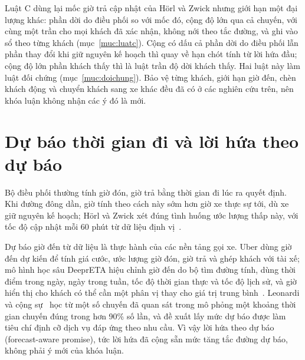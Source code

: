 Luật C dùng lại mốc giờ trả cập nhật của Hörl và Zwick nhưng giới hạn một đại lượng khác: phần dời do điều phối so với
mốc đó, cộng độ lớn qua cả chuyến, với cùng một trần cho mọi khách đã xác nhận, không nới theo tắc đường, và ghi vào sổ
theo từng khách (mục~\ref{muc:luatc}). Cộng có dấu cả phần dời do điều phối lẫn phần thay đổi khi giữ nguyên kế hoạch
thì quay về hạn chót tính từ lời hứa đầu; cộng độ lớn phần khách thấy thì là luật trần độ dời khách thấy. Hai luật
này làm luật đối chứng (mục~\ref{muc:doichung}). Bảo vệ từng khách, giới hạn giờ đến, chèn khách động và chuyển khách
sang xe khác đều đã có ở các nghiên cứu trên, nên khóa luận không nhận các ý đó là mới.

\section{Dự báo thời gian đi và lời hứa theo dự báo}
\label{muc:c2-dubao}

Bộ điều phối thường tính giờ đón, giờ trả bằng thời gian đi lúc ra quyết định. Khi đường đông dần, giờ tính theo cách
này sớm hơn giờ xe thực sự tới, dù xe giữ nguyên kế hoạch; Hörl và Zwick xét đúng tình huống ước lượng thấp này, với
tốc độ cập nhật mỗi 60 phút từ dữ liệu định vị~\cite{horl2022}.

Dự báo giờ đến từ dữ liệu là thực hành của các nền tảng gọi xe. Uber dùng giờ đến dự kiến để tính giá cước, ước lượng
giờ đón, giờ trả và ghép khách với tài xế; mô hình học sâu DeeprETA hiệu chỉnh giờ đến do bộ tìm đường tính, dùng
thời điểm trong ngày, ngày trong tuần, tốc độ thời gian thực và tốc độ lịch sử, và giờ hiển thị cho khách có thể cần
một phân vị thay cho giá trị trung bình~\cite{hu2022}. Leonardi và cộng sự~\cite{leonardi2024} học từ một số chuyến đã
quan sát trong mô phỏng một khoảng thời gian chuyến đúng trong hơn 90\% số lần, và đề xuất lấy mức dự báo được làm
tiêu chí định cỡ dịch vụ đáp ứng theo nhu cầu. Vì vậy lời hứa theo dự báo (forecast-aware promise), tức lời hứa đã
cộng sẵn mức tăng tắc đường dự báo, không phải ý mới của khóa luận.

